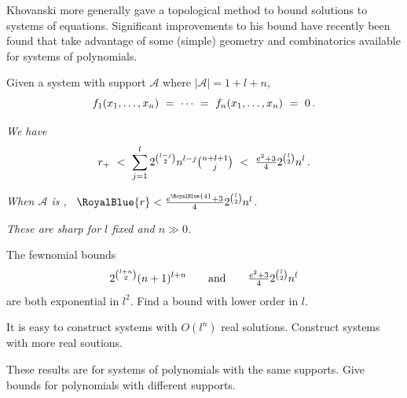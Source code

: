 \documentclass[17pt,landscape]{Narrow}
\newcommand{\DeCo}{\RoyalBlue}
\newcommand{\calA}{{\mathcal A}}
\begin{document}
\begin{flushleft}
Khovanski more generally gave a topological method to bound solutions to
systems of equations.
Significant improvements to his bound have recently been found that take advantage of some (simple)
geometry and combinatorics available for systems of polynomials.\vspace{-5pt}

\noindent
Given a system with support $\calA$ where $|\calA|=1{+}l{+}n$,\vspace{-8pt}
\[
   f_1(x_1,\dotsc,x_n)\ =\ \dotsb\ =\ f_n(x_1,\dotsc,x_n)\ =\ 0\,.\vspace{-18pt}
\]

\noindent{}
{\sl We have \vspace{-8pt}
\[ 
r_+ \ <\   \sum_{j=1}^l 2^{\binom{l-j}{2}}n^{l-j}\tbinom{n{+}l{+}1}{j}
  \ <\  \tfrac{e^2+3}{4}2^{\binom{l}{2}}n^l\,.\vspace{-18pt}
\]
}

\noindent{}
{\sl When $\calA$ is \DeCo{primitive}, \ $\DeCo{r} < \frac{e^{\DeCo{4}}+3}{4}2^{\binom{l}{2}}n^l$. }


\noindent{}
{\sl These are sharp for $l$ fixed and $n\gg 0$.}

\slide{}
\LogoOn
\begin{center}
\end{center}

The fewnomial bounds\vspace{-8pt}
\[
   2^{\binom{l+n}{2}}(n+1)^{l+n}\qquad\mbox{and}\qquad
\tfrac{e^2+3}{4}2^{\binom{l}{2}}n^l\vspace{-8pt}
\]
are both exponential in $l^2$.\newline
\noindent{}  Find a bound with lower order in $l$.

It is easy to construct systems with $O(l^n)$ real solutions.\newline
\noindent{} Construct systems with more real soutions.

These results are for systems of polynomials with the same supports.\newline
\noindent{} Give bounds for polynomials with different supports.



\end{flushleft}
\end{document}
